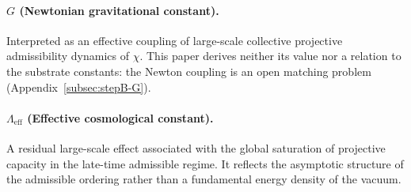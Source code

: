   \paragraph{\texorpdfstring{$G$}{G} (Newtonian gravitational constant).}
    Interpreted as an effective coupling of large-scale collective projective
    admissibility dynamics of $\chi$.
    This paper derives neither its value nor a relation to the substrate constants:
    the Newton coupling is an open matching problem (Appendix~\ref{subsec:stepB-G}).

  \paragraph{\texorpdfstring{$\Lambda_{\mathrm{eff}}$}{Λeff} (Effective cosmological constant).}
    A residual large-scale effect associated with the global saturation of projective
    capacity in the late-time admissible regime.
    It reflects the asymptotic structure of the admissible ordering rather than
    a fundamental energy density of the vacuum.
